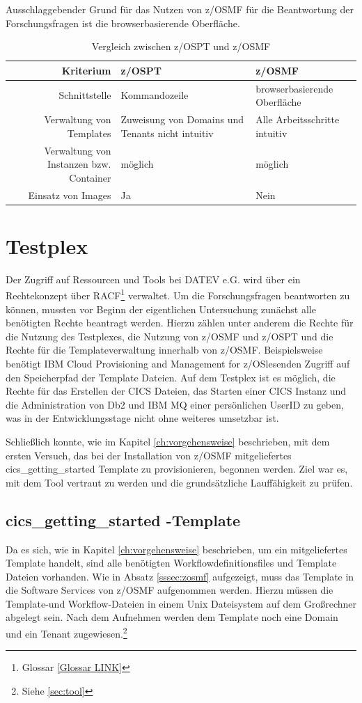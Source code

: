Ausschlaggebender Grund für das Nutzen von z/OSMF für die Beantwortung der Forschungsfragen ist die browserbasierende Oberfläche.
\begin{table}
\centering
\begin{tabularx}{\textwidth}{r|X|X}
Kriterium & z/OSPT & z/OSMF\\
\hline
Schnittstelle & Kommandozeile & browserbasierende Oberfläche\\
\hline
Verwaltung von Templates & Zuweisung von Domains und Tenants nicht intuitiv & Alle Arbeitsschritte intuitiv\\
\hline
Verwaltung von Instanzen bzw. Container &  möglich & möglich\\
\hline
Einsatz von Images & Ja & Nein\\
\end{tabularx}
\caption{Vergleich zwischen z/OSPT und z/OSMF}
\label{tab:vglzosptzosmf}
\end{table}

\section{Testplex}
Der Zugriff auf Ressourcen und Tools bei DATEV e.G. wird über ein Rechtekonzept über RACF\footnote{Glossar \ref{Glossar LINK}} verwaltet. 
Um die Forschungsfragen beantworten zu können, mussten vor Beginn der eigentlichen Untersuchung zunächst alle benötigten Rechte beantragt werden.
Hierzu zählen unter anderem die Rechte für die Nutzung des Testplexes, die Nutzung von z/OSMF und z/OSPT und die Rechte für die Templateverwaltung innerhalb von z/OSMF. 
Beispielsweise benötigt \glqq IBM Cloud Provisioning and Management for z/OS\grqq lesenden Zugriff auf den Speicherpfad der Template Dateien.
Auf dem Testplex ist es  möglich, die Rechte für das Erstellen der CICS Dateien, das Starten einer CICS Instanz und die Administration von Db2 und IBM MQ einer persönlichen UserID zu geben, was in der Entwicklungsstage nicht ohne weiteres umsetzbar ist. 

Schließlich konnte, wie im Kapitel \ref{ch:vorgehensweise} beschrieben, mit dem ersten Versuch, das bei der Installation von z/OSMF mitgeliefertes \glqq cics\_getting\_started\grqq{} Template zu provisionieren, begonnen werden.
Ziel war es, mit dem Tool vertraut zu werden und die grundsätzliche Lauffähigkeit zu prüfen.

\subsection{\glqq cics\_getting\_started \grqq-Template}\label{ssec:cgs}
Da es sich, wie in Kapitel \ref{ch:vorgehensweise} beschrieben, um ein mitgeliefertes Template handelt, sind alle benötigten Workflowdefinitionsfiles und Template Dateien vorhanden.
Wie in Absatz \ref{sssec:zosmf} aufgezeigt, muss das Template in die Software Services von z/OSMF aufgenommen werden.
Hierzu müssen die Template-und Workflow-Dateien in einem Unix Dateisystem auf dem Großrechner abgelegt sein. 
Nach dem Aufnehmen werden dem Template noch eine Domain und ein Tenant zugewiesen.\footnote{Siehe \ref{sec:tool}}

